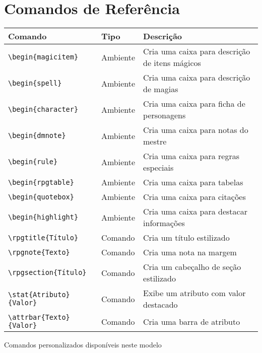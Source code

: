 \cleardoublepage
\chapter*{Comandos de Referência}

\begin{rpgtable}
\begin{tabularx}{\textwidth}{llX}
\toprule
\textbf{Comando} & \textbf{Tipo} & \textbf{Descrição} \\
\midrule
\verb|\begin{magicitem}| & Ambiente & Cria uma caixa para descrição de itens mágicos \\
\verb|\begin{spell}| & Ambiente & Cria uma caixa para descrição de magias \\
\verb|\begin{character}| & Ambiente & Cria uma caixa para ficha de personagens \\
\verb|\begin{dmnote}| & Ambiente & Cria uma caixa para notas do mestre \\
\verb|\begin{rule}| & Ambiente & Cria uma caixa para regras especiais \\
\verb|\begin{rpgtable}| & Ambiente & Cria uma caixa para tabelas \\
\verb|\begin{quotebox}| & Ambiente & Cria uma caixa para citações \\
\verb|\begin{highlight}| & Ambiente & Cria uma caixa para destacar informações \\
\verb|\rpgtitle{Título}| & Comando & Cria um título estilizado \\
\verb|\rpgnote{Texto}| & Comando & Cria uma nota na margem \\
\verb|\rpgsection{Título}| & Comando & Cria um cabeçalho de seção estilizado \\
\verb|\stat{Atributo}{Valor}| & Comando & Exibe um atributo com valor destacado \\
\verb|\attrbar{Texto}{Valor}| & Comando & Cria uma barra de atributo \\
\bottomrule
\end{tabularx}
\caption{Comandos personalizados disponíveis neste modelo}
\label{tab:comandos}
\end{rpgtable}

\cleardoublepage
\printbibliography[title=Referências]
